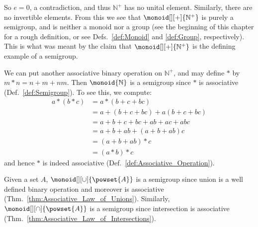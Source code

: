         So $e=0$, a contradiction, and thus $\mathbb{N}^{+}$ has no unital
        element. Similarly, there are no invertible elements. From this we see
        that $\monoid[][+]{\mathbb{N}^{+}}$ is purely a semigroup, and is
        neither a monoid nor a group (see the beginning of this chapter for a
        rough definition, or see Defs.~\ref{def:Monoid} and \ref{def:Group},
        respectively). This is what was meant by the claim that
        $\monoid[][+]{\mathbb{N}^{+}}$ is the defining example of a semigroup.
        \begin{example}
            We can put another associative binary operation on $\mathbb{N}^{+}$,
            and may define $*$ by $m*n=n+m+nm$. Then $\monoid{\mathbb{N}}$ is a
            semigroup since $*$ is associative (Def.~\ref{def:Semigroup}). To
            see this, we compute:
            \begin{align}
                a*(b*c)&=a*(b+c+bc)\\
                    &=a+(b+c+bc)+a(b+c+bc)\\
                    &=a+b+c+bc+ab+ac+abc\\
                    &=a+b+ab+(a+b+ab)c\\
                    &=(a+b+ab)*c\\
                    &=(a*b)*c
            \end{align}
            and hence $*$ is indeed associative
            (Def.~\ref{def:Associative_Operation}).
        \end{example}
        \begin{example}
            Given a set $A$, $\monoid[][\cup]{\powset{A}}$ is a semigroup
            since union is a well defined binary operation and moreover is
            associative (Thm.~\ref{thm:Associative_Law_of_Unions}). Similarly,
            $\monoid[][\cap]{\powset{A}}$ is a semigroup since intersection is
            associative (Thm.~\ref{thm:Associative_Law_of_Intersections}).
        \end{example}
